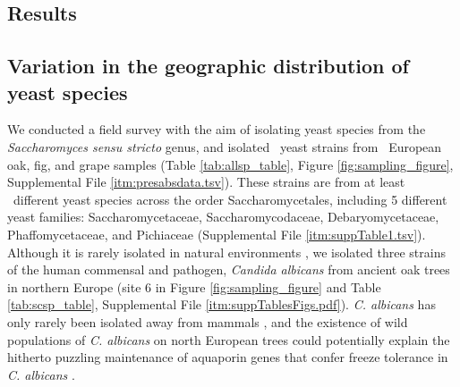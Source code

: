 \documentclass[12pt]{article}
\begin{document}
\begin{linenumbers}
\section*{Results}
\label{Results}

\subsection*{Variation in the geographic distribution of yeast species}

We conducted a field survey with the aim of isolating yeast species from the \textit{Saccharomyces sensu stricto} genus, and isolated \yeast\ yeast strains from \samplecount\ European oak, fig, and grape samples (Table \ref{tab:allsp_table}, Figure \ref{fig:sampling_figure}, Supplemental File \ref{itm:presabsdata.tsv}). These strains are from at least \speciescount\ different yeast species across the order Saccharomycetales, including 5 different yeast families: Saccharomycetaceae, Saccharomycodaceae, Debaryomycetaceae, Phaffomycetaceae, and Pichiaceae (Supplemental File \ref{itm:suppTable1.tsv}). Although it is rarely isolated in natural environments \citep{tanghe_aquaporin_2005,lachance_chapter_2011-5,maganti_ecological_2011}, we isolated three strains of the human commensal and pathogen, \textit{Candida albicans} from ancient oak trees in northern Europe (site 6 in Figure \ref{fig:sampling_figure} and Table \ref{tab:scsp_table}, Supplemental File \ref{itm:suppTablesFigs.pdf}). \textit{C. albicans} has only rarely been isolated away from mammals \citep{tanghe_aquaporin_2005,lachance_chapter_2011-5,maganti_ecological_2011}, and the existence of wild populations of \textit{C. albicans} on north European trees could potentially explain the hitherto puzzling maintenance of aquaporin genes that confer freeze tolerance in \textit{C. albicans} \citep{tanghe_aquaporin_2005}.


\end{linenumbers}
\end{document}
